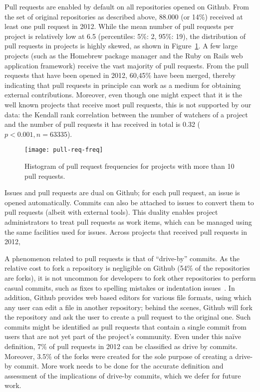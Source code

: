 \documentclass{sig-alternate}
\begin{document}
Pull requests are enabled by default on all repositories opened on Github.  From
the set of original repositories as described above, 88.000 (or 14\%) received
at least one pull request in 2012.  While the mean number of pull requests per
project is relatively low at 6.5 (percentiles: 5\%: 2, 95\%: 19), the
distribution of pull requests in projects is highly skewed, as shown in
Figure~\ref{fig:prfreq}.  A few large projects (such as the Homebrew package
manager and the Ruby on Rails web application framework) receive the vast
majority of pull requests. From the pull requests that have been opened in
2012, 60,45\% have been merged, thereby indicating that pull requests in
principle can work as a medium for obtaining external contributions.  Moreover,
even though one might expect that it is the well known projects that receive
most pull requests, this is not supported by our data: the Kendall rank
correlation between the number of watchers of a project and the number of pull
requests it has received in total is 0.32 ($p < 0.001, n = 63335$).

\begin{figure}
  \begin{center}
    \texttt{[image: pull-req-freq]}
  \end{center}
  \caption{Histogram of pull request frequencies for projects with more than
  10 pull requests.}
  \label{fig:prfreq}
\end{figure}

Issues and pull requests are dual on Github; for each pull request, an
issue is opened automatically. Commits can also be attached to issues to
convert them to pull requests (albeit with external tools). This duality
enables project administrators to treat pull requests as work items,
which can be managed using the same facilities used for issues.
Across projects that received pull requests in 2012, 

A phenomenon related to pull requests is that of ``drive-by'' commits. As the
relative cost to fork a repository is negligible on Github (54\% of the
repositories are forks), it is not uncommon for developers to fork other
repositories to perform casual commits, such as fixes to spelling mistakes or
indentation issues~\cite{Pham13}. In addition, Github provides web based editors
for various file formats, using which any user can edit a file in another
repository; behind the scenes, Github will fork the repository and ask the user
to create a pull request to the original one. Such commits might be identified
as pull requests that contain a single commit from users that are not yet part
of the project's community. Even under this na\"ive definition, 7\% of pull
requests in 2012 can be classified as drive by commits. Moreover, 3.5\% of the
forks were created for the sole purpose of creating a drive-by commit.  More
work needs to be done for the accurate definition and assessment of the
implications of drive-by commits, which we defer for future work.
\end{document}
